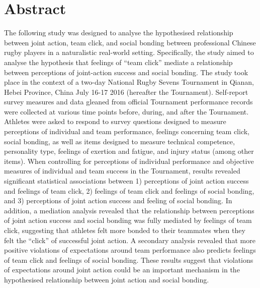 \section{Abstract}
The following study was designed to analyse the hypothesised relationship between joint action, team click, and social bonding between professional Chinese rugby players in a naturalistic real-world setting.  Specifically, the study aimed to analyse the hypothesis that feelings of ``team click'' mediate a relationship between perceptions of joint-action success and social bonding.  The study took place in the context of a two-day National Rugby Sevens Tournament in Qianan, Hebei Province, China July 16-17 2016 (hereafter the Tournament).  Self-report survey measures and data gleaned from official Tournament performance records were collected at various time points before, during, and after the Tournament.  Athletes were asked to respond to survey questions designed to measure perceptions of individual and team performance, feelings concerning team click, social bonding, as well as items designed to measure technical competence, personality type, feelings of exertion and fatigue, and injury status (among other items). When controlling for perceptions of individual performance and objective measures of individual and team success in the Tournament, results revealed significant statistical associations between 1) perceptions of joint action success and feelings of team click, 2) feelings of team click and feelings of social bonding, and 3) perceptions of joint action success and feeling of social bonding.  In addition, a mediation analysis revealed that the relationship between perceptions of joint action success and social bonding was fully mediated by feelings of team click, suggesting that athletes felt more bonded to their teammates when they felt the ``click'' of successful joint action.  A secondary analysis revealed that more positive violations of expectations around team performance also predicts feelings of team click and feelings of social bonding.  These results suggest that violations of expectations around joint action could be an important mechanism in the hypothesised relationship between joint action and social bonding.


